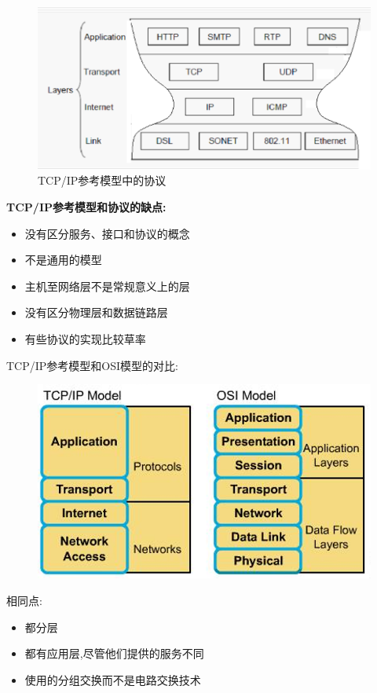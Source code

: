 \documentclass[UTF8,a4paper]{ctexart}
\begin{document}
  \begin{figure}[H]
    \centering
    \includegraphics[scale = 0.3]{assets/jisuanjiwangluo_8c48b.png}
    \caption{TCP/IP参考模型中的协议}
  \end{figure}

  \textbf{TCP/IP参考模型和协议的缺点:}
  \begin{itemize}
    \item 没有区分服务、接口和协议的概念
    \item 不是通用的模型
    \item 主机至网络层不是常规意义上的层
    \item 没有区分物理层和数据链路层
    \item 有些协议的实现比较草率
  \end{itemize}

  TCP/IP参考模型和OSI模型的对比:
  \begin{figure}[H]
    \centering
    \includegraphics[scale = 0.3]{assets/jisuanjiwangluo_60bc3.png}
  \end{figure}

  相同点:
  \begin{itemize}
    \item 都分层
    \item 都有应用层,尽管他们提供的服务不同
    \item 使用的分组交换而不是电路交换技术
  \end{itemize}
\end{document}

